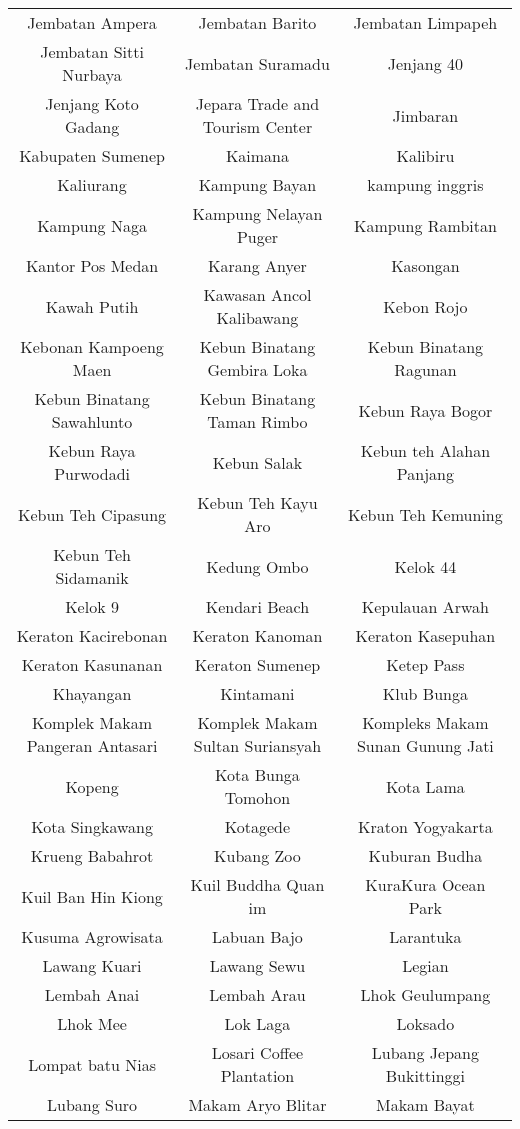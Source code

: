 \begin{table}[H]
\begin{tabular}{ c | c | c}
Jembatan Ampera & Jembatan Barito & Jembatan Limpapeh\\
Jembatan Sitti Nurbaya & Jembatan Suramadu & Jenjang 40\\
Jenjang Koto Gadang & Jepara Trade and Tourism Center & Jimbaran\\
Kabupaten Sumenep & Kaimana & Kalibiru\\
Kaliurang & Kampung Bayan & kampung inggris\\
Kampung Naga & Kampung Nelayan Puger & Kampung Rambitan\\
Kantor Pos Medan & Karang Anyer & Kasongan\\
Kawah Putih & Kawasan Ancol Kalibawang & Kebon Rojo\\
Kebonan Kampoeng Maen & Kebun Binatang Gembira Loka & Kebun Binatang Ragunan\\
Kebun Binatang Sawahlunto & Kebun Binatang Taman Rimbo & Kebun Raya Bogor\\
Kebun Raya Purwodadi & Kebun Salak & Kebun teh Alahan Panjang\\
Kebun Teh Cipasung & Kebun Teh Kayu Aro & Kebun Teh Kemuning\\
Kebun Teh Sidamanik & Kedung Ombo & Kelok 44\\
Kelok 9 & Kendari Beach & Kepulauan Arwah\\
Keraton Kacirebonan & Keraton Kanoman & Keraton Kasepuhan\\
Keraton Kasunanan & Keraton Sumenep & Ketep Pass\\
Khayangan & Kintamani & Klub Bunga\\
Komplek Makam Pangeran Antasari & Komplek Makam Sultan Suriansyah & Kompleks Makam Sunan Gunung Jati\\
Kopeng & Kota Bunga Tomohon & Kota Lama\\
Kota Singkawang & Kotagede & Kraton Yogyakarta\\
Krueng Babahrot & Kubang Zoo & Kuburan Budha\\
Kuil Ban Hin Kiong & Kuil Buddha Quan im & KuraKura Ocean Park\\
Kusuma Agrowisata & Labuan Bajo & Larantuka\\
Lawang Kuari & Lawang Sewu & Legian\\
Lembah Anai & Lembah Arau & Lhok Geulumpang\\
Lhok Mee & Lok Laga & Loksado\\
Lompat batu Nias & Losari Coffee Plantation & Lubang Jepang Bukittinggi\\
Lubang Suro & Makam Aryo Blitar & Makam Bayat\\

\end{tabular}
\end{table}
